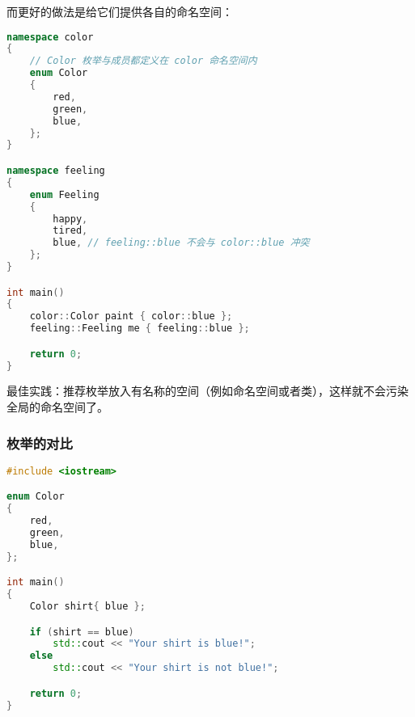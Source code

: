 \documentclass[../../LearnCpp.tex]{subfiles}
\begin{document}
而更好的做法是给它们提供各自的命名空间：

\begin{lstlisting}[language=C++]
namespace color
{
    // Color 枚举与成员都定义在 color 命名空间内
    enum Color
    {
        red,
        green,
        blue,
    };
}

namespace feeling
{
    enum Feeling
    {
        happy,
        tired,
        blue, // feeling::blue 不会与 color::blue 冲突
    };
}

int main()
{
    color::Color paint { color::blue };
    feeling::Feeling me { feeling::blue };

    return 0;
}
\end{lstlisting}

最佳实践：推荐枚举放入有名称的空间（例如命名空间或者类），这样就不会污染全局的命名空间了。

\subsubsection*{枚举的对比}

\begin{lstlisting}[language=C++]
#include <iostream>

enum Color
{
    red,
    green,
    blue,
};

int main()
{
    Color shirt{ blue };

    if (shirt == blue)
        std::cout << "Your shirt is blue!";
    else
        std::cout << "Your shirt is not blue!";

    return 0;
}
\end{lstlisting}
\end{document}
